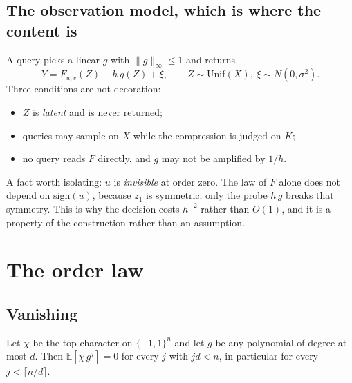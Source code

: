 \subsection{The observation model, which is where the content is}

A query picks a linear $g$ with $\|g\|_{\infty}\le1$ and returns
\begin{equation}
Y=F_{u,v}(Z)+h\,g(Z)+\xi,\qquad Z\sim\mathrm{Unif}(X),\ \xi\sim N(0,\sigma^{2}).
\label{eq:obs}
\end{equation}
Three conditions are not decoration:
\begin{itemize}
\item $Z$ is \emph{latent} and is never returned;
\item queries may sample on $X$ while the compression is judged on $K$;
\item no query reads $F$ directly, and $g$ may not be amplified by $1/h$.
\end{itemize}


A fact worth isolating: $u$ is \emph{invisible} at order zero. The law of $F$ alone does not
depend on $\mathrm{sign}(u)$, because $z_{1}$ is symmetric; only the probe $h\,g$ breaks that
symmetry. This is why the decision costs $h^{-2}$ rather than $O(1)$, and it is a property of
the construction rather than an assumption. \CERT{}

\section{The order law}
\label{sec:order}

\subsection{Vanishing}

\begin{theorem}
\label{thm:vanish}
Let $\chi$ be the top character on $\{-1,1\}^{n}$ and let $g$ be any polynomial of degree at
most $d$. Then $\mathbb{E}[\chi\,g^{j}]=0$ for every $j$ with $jd<n$, in particular for every
$j<\lceil n/d\rceil$.
\end{theorem}

